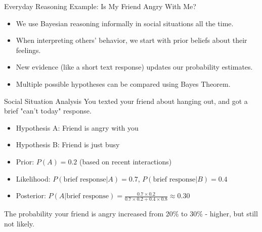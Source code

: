 \documentclass{beamer}
\begin{document}
	\begin{frame}{Everyday Reasoning Example: Is My Friend Angry With Me?}
		\scriptsize
		\begin{itemize}
			\item We use Bayesian reasoning informally in social situations all the time.
			\item When interpreting others' behavior, we start with prior beliefs about their feelings.
			\item New evidence (like a short text response) updates our probability estimates.
			\item Multiple possible hypotheses can be compared using Bayes Theorem.
		\end{itemize}
		
		\begin{exampleblock}{Social Situation Analysis}
			You texted your friend about hanging out, and got a brief "can't today" response.
			\begin{itemize}
				\item Hypothesis A: Friend is angry with you
				\item Hypothesis B: Friend is just busy
				\item Prior: $P(A) = 0.2$ (based on recent interactions)
				\item Likelihood: $P(\text{brief response}|A) = 0.7$, $P(\text{brief response}|B) = 0.4$
				\item Posterior: $P(A|\text{brief response}) = \frac{0.7 \times 0.2}{0.7 \times 0.2 + 0.4 \times 0.8} \approx 0.30$
			\end{itemize}
			The probability your friend is angry increased from 20\% to 30\% - higher, but still not likely.
		\end{exampleblock}
	\end{frame}
	
\end{document}
